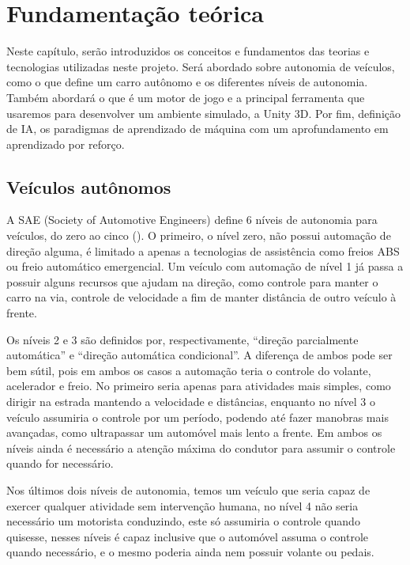 \chapter{Fundamentação teórica}
Neste capítulo, serão introduzidos os conceitos e fundamentos das teorias e tecnologias utilizadas neste projeto. Será abordado sobre autonomia de veículos, como o que define um carro autônomo e os diferentes níveis de autonomia. Também abordará o que é um motor de jogo e a principal ferramenta que usaremos para desenvolver um ambiente simulado, a Unity 3D. Por fim, definição de IA, os paradigmas de aprendizado de máquina com um aprofundamento em aprendizado por reforço.

\section{Veículos autônomos}
A SAE (Society of Automotive Engineers) define 6 níveis de autonomia para veículos, do zero ao cinco (). O primeiro, o nível zero, não possui automação de direção alguma, é limitado a apenas a tecnologias de assistência como freios ABS ou freio automático emergencial. Um veículo com automação de nível 1 já passa a possuir alguns recursos que ajudam na direção, como controle para manter o carro na via, controle de velocidade a fim de manter distância de outro veículo à frente. 

Os níveis 2 e 3 são definidos por, respectivamente, ``direção parcialmente automática'' e ``direção automática condicional''. A diferença de ambos pode ser bem sútil, pois em ambos os casos a automação teria o controle do volante, acelerador e freio. No primeiro seria apenas para atividades mais simples, como dirigir na estrada mantendo a velocidade e distâncias, enquanto no nível 3 o veículo assumiria o controle por um período, podendo até fazer manobras mais avançadas, como ultrapassar um automóvel mais lento a frente. Em ambos os níveis ainda é necessário a atenção máxima do condutor para assumir o controle quando for necessário.

Nos últimos dois níveis de autonomia, temos um veículo que seria capaz de exercer qualquer atividade sem intervenção humana, no nível 4 não seria necessário um motorista conduzindo, este só assumiria o controle quando quisesse, nesses níveis é capaz inclusive que o automóvel assuma o controle quando necessário, e o mesmo poderia ainda nem possuir volante ou pedais.

